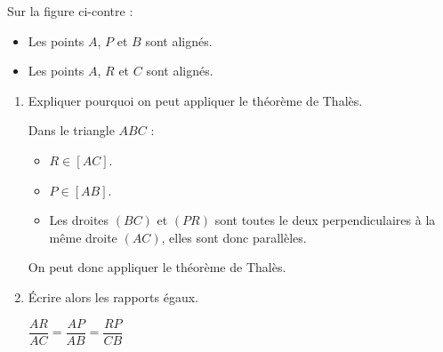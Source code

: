 \begin{corrige}
    \phantom{rrr}
    
    \begin{minipage}{0.65\linewidth}
         Sur la figure ci-contre :
        \begin{itemize}
            \item Les points $A$, $P$ et $B$ sont alignés.
            \item Les points $A$, $R$ et $C$ sont alignés.
        \end{itemize}
        \begin{enumerate}
            \item Expliquer pourquoi on peut appliquer le théorème de Thalès.
            
            {\color{red} Dans le triangle $ABC$ :
            \begin{itemize}
                \item $R \in [AC]$.
                \item $P \in [AB]$.
                \item Les droites $(BC)$ et $(PR)$ sont toutes le deux perpendiculaires à la même droite $(AC)$,
                elles sont donc parallèles.
            \end{itemize}
            On peut donc appliquer le théorème de Thalès.            
            }
            \item Écrire alors les rapports égaux.
            
            {\color{red} $\dfrac{AR}{AC}=\dfrac{AP}{AB}=\dfrac{RP}{CB}$}
        \end{enumerate}
    \end{minipage}
    \begin{minipage}{0.3\linewidth}
        \hspace*{-3mm}
        \vspace*{-10mm}
    \end{minipage}
\end{corrige}

